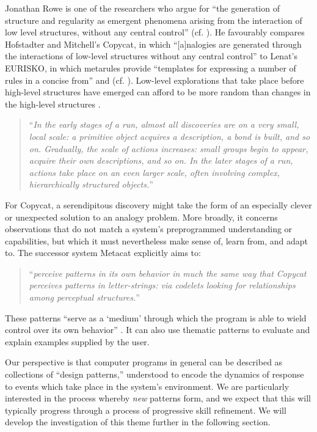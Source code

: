 Jonathan Rowe \cite{rowe1994creativity} is one of the researchers who
argue for ``the generation of structure and regularity as emergent
phenomena arising from the interaction of low level structures,
without any central control'' (cf. \cite{pearce-boden-and-beyond}).
He favourably compares Hofstadter and Mitchell's {\sf Copycat}, in
which ``[a]nalogies are generated through the interactions of
low-level structures without any central control'' to Lenat's {\sf
  EURISKO}, in which metarules provide ``templates for expressing a
number of rules in a concise from'' and
(cf. \cite{hofstadter1994copycat,mitchell1993analogy}).
%
Low-level explorations that take place before high-level structures
have emerged can afford to be more random than changes in the
high-level structures \cite[pp. 232--233]{hofstadter1994copycat}.
\begin{quote}
``\emph{In the early stages of a run, almost all discoveries are on a
    very small, local scale: a primitive object acquires a
    description, a bond is built, and so on.  Gradually, the scale of
    actions increases: small groups begin to appear, acquire their own
    descriptions, and so on.  In the later stages of a run, actions
    take place on an even larger scale, often involving complex,
    hierarchically structured objects.}''
  \cite[p. 228]{hofstadter1994copycat}
\end{quote}

For {\sf Copycat}, a serendipitous discovery might take
the form of an especially clever or unexpected solution to an analogy
problem.  More broadly, it concerns observations that do not match a
system's preprogrammed understanding or capabilities, but which it
must nevertheless make sense of, learn from, and adapt to.  The
successor system {\sf Metacat} explicitly aims to:
\begin{quote}
``\emph{perceive patterns in its own behavior in much the same way
    that Copycat perceives patterns in letter-strings: via codelets
    looking for relationships among perceptual
    structures.}''~\cite{DBLP:journals/jetai/Marshall06}
\end{quote}

These patterns ``serve as a `medium' through which the program is able
to wield control over its own behavior''
\cite{DBLP:journals/jetai/Marshall06}.  It can also use thematic
patterns to evaluate and explain examples supplied by the user.

Our perspective is that computer programs in general can be described
as collections of ``design patterns,'' understood to encode the
dynamics of response to events which take place in the system's
environment.  We are particularly interested in the process whereby
\emph{new} patterns form, and we expect that this will typically
progress through a process of progressive skill refinement.  We will
develop the investigation of this theme further in the following
section.
